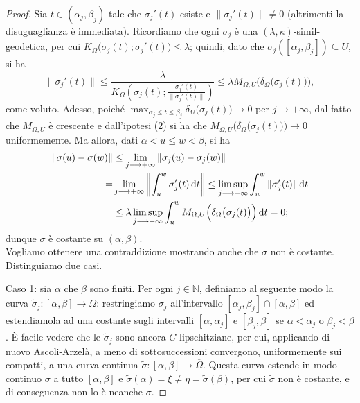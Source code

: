 \begin{proof}
    Sia $t\in(\alpha_j,\beta_j)$ tale che $\sigma_j'(t)$ esiste e $\|\sigma_j'(t)\|\not=0$ (altrimenti la disuguaglianza è immediata). Ricordiamo che ogni $\sigma_j$ è una $(\lambda,\kappa)$-simil-geodetica, per cui $K_\Omega\big(\sigma_j(t);\sigma_j'(t)\big)\le\lambda$; quindi, dato che $\sigma_j([\alpha_j,\beta_j])\subseteq U$, si ha
    $$\|\sigma_j'(t)\|\le \frac{\lambda}{K_\Omega\left(\sigma_j(t);\frac{\sigma_j'(t)}{\|\sigma_j'(t)\|}\right)}\le\lambda M_{\Omega,U}\Big(\delta_\Omega\big(\sigma_j(t)\big)\Big),$$
    come voluto. Adesso, poiché $\displaystyle\max_{\alpha_j\le t\le \beta_j}\delta_\Omega\big(\sigma_j(t)\big)\longrightarrow 0$ per $j\longrightarrow+\infty$, dal fatto che $M_{\Omega,U}$ è crescente e dall'ipotesi (2) si ha che $M_{\Omega,U}\Big(\delta_\Omega\big(\sigma_j(t)\big)\Big)\longrightarrow 0$ uniformemente. Ma allora, dati $\alpha<u\le w<\beta$, si ha
    \begin{align*}
        \|\sigma(u)-\sigma(w)\|&\le \lim_{j\longrightarrow+\infty}\|\sigma_j(u)-\sigma_j(w)\| \\
        =&\lim_{j\longrightarrow+\infty}\left\|\int_u^w\sigma_j'(t)\mathop{}\!\mathrm{d} t\right\|\le \limsup_{j\longrightarrow+\infty} \int_u^w \|\sigma_j'(t)\|\mathop{}\!\mathrm{d} t\\
        &\le \lambda\limsup_{j\longrightarrow+\infty} \int_u^w M_{\Omega,U}\Big(\delta_\Omega\big(\sigma_j(t)\big)\Big)\mathop{}\!\mathrm{d} t=0;
    \end{align*}
    dunque $\sigma$ è costante su $(\alpha,\beta)$. \\

    Vogliamo ottenere una contraddizione mostrando anche che $\sigma$ non è costante. Distinguiamo due casi.

    Caso 1: sia $\alpha$ che $\beta$ sono finiti. Per ogni $j\in\mathbb{N}$, definiamo al seguente modo la curva $\tilde{\sigma}_j:[\alpha,\beta]\longrightarrow\Omega$: restringiamo $\sigma_j$ all'intervallo $[\alpha_j,\beta_j]\cap[\alpha,\beta]$ ed estendiamola ad una costante sugli intervalli $[\alpha,\alpha_j]$ e $[\beta_j,\beta]$ se $\alpha<\alpha_j$ o $\beta_j<\beta$. È facile vedere che le $\tilde{\sigma}_j$ sono ancora $C$-lipschitziane, per cui, applicando di nuovo Ascoli-Arzelà, a meno di sottosuccessioni convergono, uniformemente sui compatti, a una curva continua $\tilde{\sigma}:[\alpha,\beta]\longrightarrow\overline{\Omega}$. Questa curva estende in modo continuo $\sigma$ a tutto $[\alpha,\beta]$ e $\tilde{\sigma}(\alpha)=\xi\not=\eta=\tilde{\sigma}(\beta)$, per cui $\tilde{\sigma}$ non è costante, e di conseguenza non lo è neanche $\sigma$.


\end{proof}

